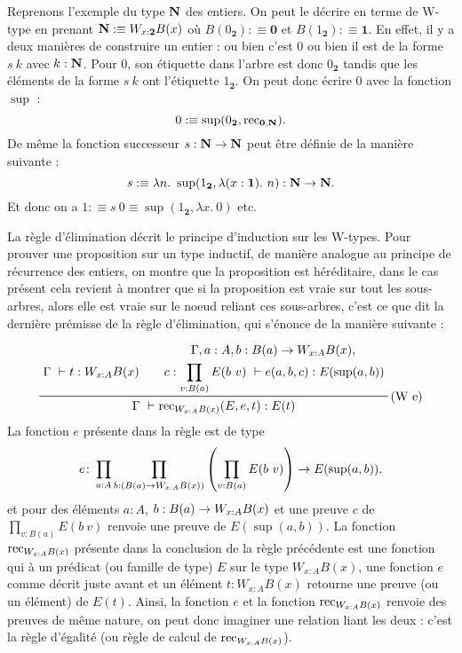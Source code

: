 \documentclass[../../rapport.tex]{subfiles}
\begin{document}
  Reprenons l'exemple du type $\mathbf N$ des entiers.
  On peut le décrire en terme de W-type en prenant $\mathbf N :\equiv W_{x: \textbf{2}}B(x)$ où $B(0_{\textbf{2}}) :\equiv \textbf{0}$
  et $B(1_{\textbf{2}}) :\equiv \textbf{1}$.
  En effet, il y a deux manières de construire un entier : ou bien c'est 0 ou bien il est de la forme $s\ k$ avec $k : \mathbf N$.
  Pour 0, son étiquette dans l'arbre est donc $0_{\textbf{2}}$ tandis que les éléments de la forme $s\ k$ ont l'étiquette
  $1_{\textbf{2}}$.
  On peut donc écrire 0 avec la fonction $\sup$ :
  $$ 0 :\equiv \sup(0_{\textbf{2}}, \operatorname{rec}_{\textbf{0}, \mathbf N}).$$
  De même la fonction successeur $s : \mathbf N \rightarrow \mathbf N$ peut être définie de la manière suivante :
  $$ s :\equiv \lambda n.\ \sup(1_{\textbf{2}}, \lambda(x : \textbf{1}).\ n) : \mathbf N \rightarrow \mathbf N.$$
  Et donc on a $1 :\equiv s\ 0 \equiv \sup(1_{\textbf{2}}, \lambda x.\ 0)$ etc.

  La règle d'élimination décrit le principe d'induction sur les W-types.
  Pour prouver une proposition sur un type inductif, de manière analogue au principe de récurrence des entiers,
  on montre que la proposition est héréditaire, dans le cas présent cela revient à montrer que si la proposition est vraie
  sur tout les sous-arbres, alors elle est vraie sur le noeud reliant ces sous-arbres, c'est ce que dit la dernière prémisse
  de la règle d'élimination, qui s'énonce de la manière suivante :

  $$
  \prfinterspace=2em
  \prftree[r]{(W e)}
  {\Gamma\ \vdash t : W_{x:A}B(x)}
  {
    \prfStackPremises
    {\Gamma, a : A, b : B(a) \fun W_{x:A}B(x),}
    {c : \prod_{v:B(a)}{E(b\ v)}\ \vdash e(a, b, c) : E(\sup(a, b))}
  }
  {\Gamma\ \vdash \rec_{W_{x:A}B(x)}(E, e, t) : E(t)}
  $$
  La fonction $e$ présente dans la règle est de type
  $$e \colon \prod_{a:A}\prod_{b:(B(a) \rightarrow W_{x:A}B(x))}\left(\prod_{v:B(a)}E(b\ v)\right) \rightarrow E(\sup(a, b)).$$
  et pour des éléments $a : A$, $b : B(a) \rightarrow W_{x:A}B(x)$ et une preuve $c$ de $\prod_{v:B(a)}{E(b\ v)}$
  renvoie une preuve de $E(\sup(a, b))$.
  La fonction $\operatorname{rec}_{W_{x:A}B(x)}$ présente dans la conclusion de la règle précédente est une fonction qui à un prédicat
  (ou famille de type) $E$ sur le type $W_{x:A}B(x)$, une fonction $e$ comme décrit juste avant et un élément $t : W_{x:A}B(x)$
  retourne une preuve (ou un élément) de $E(t)$. Ainsi, la fonction $e$ et la fonction $\operatorname{rec}_{W_{x:A}B(x)}$ renvoie des preuves de même nature,
  on peut donc imaginer une relation liant les deux : c'est la règle d'égalité (ou règle de calcul de $\operatorname{rec}_{W_{x:A}B(x)}$).
\end{document}
